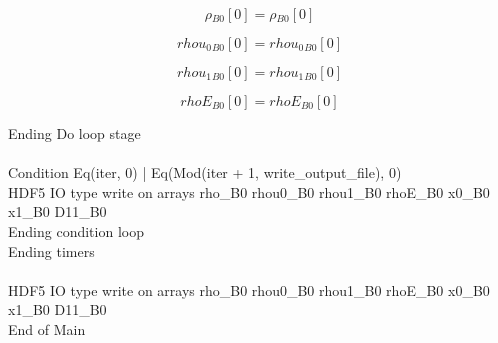 \documentclass{article}
\begin{document}
\begin{dmath}{\rho{_{B0}}}[{0}] = {\rho{_{B0}}}[{0}]\end{dmath}

\begin{dmath}{rhou_{0}{_{B0}}}[{0}] = {rhou_{0}{_{B0}}}[{0}]\end{dmath}

\begin{dmath}{rhou_{1}{_{B0}}}[{0}] = {rhou_{1}{_{B0}}}[{0}]\end{dmath}

\begin{dmath}{rhoE{_{B0}}}[{0}] = {rhoE{_{B0}}}[{0}]\end{dmath}

\noindent Ending Do loop stage\\
\\\noindent Condition Eq(iter, 0) | Eq(Mod(iter + 1, write_output_file), 0)\\\noindent HDF5 IO type write on arrays rho_B0 rhou0_B0 rhou1_B0 rhoE_B0 x0_B0 x1_B0 D11_B0\\\noindent Ending condition loop %
\\\noindent Ending timers\\
\\\noindent HDF5 IO type write on arrays rho_B0 rhou0_B0 rhou1_B0 rhoE_B0 x0_B0 x1_B0 D11_B0\\\noindent End of Main\\
\end{document}
